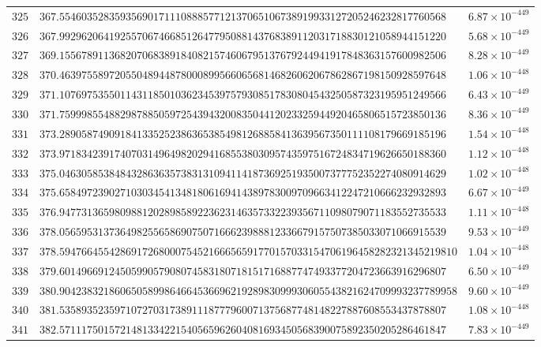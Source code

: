 \documentclass[12pt,reqno]{amsart}
\theoremstyle{remark}
\begin{document}
\begin{longtable}{clc}
$325$ & $367.5546035283593569017111088857712137065106738919933127205246232817760568$ & $6.87\times 10^{-449}$ \\
$326$ & $367.9929620641925570674668512647795088143768389112031718830121058944151220$ & $5.68\times 10^{-449}$ \\
$327$ & $369.1556789113682070683891840821574606795137679244941917848363157600982506$ & $8.28\times 10^{-449}$ \\
$328$ & $370.4639755897205504894487800089956606568146826062067862867198150928597648$ & $1.06\times 10^{-448}$ \\
$329$ & $371.1076975355011431185010362345397579308517830804543250587323195951249566$ & $6.43\times 10^{-449}$ \\
$330$ & $371.7599985548829878850597254394320083504412023325944920465806515723850136$ & $8.36\times 10^{-449}$ \\
$331$ & $373.2890587490918413352523863653854981268858413639567350111108179669185196$ & $1.54\times 10^{-448}$ \\
$332$ & $373.9718342391740703149649820294168553803095743597516724834719626650188360$ & $1.12\times 10^{-448}$ \\
$333$ & $375.0463058538484328636357383131094114187369251935007377752352274080914629$ & $1.02\times 10^{-448}$ \\
$334$ & $375.6584972390271030345413481806169414389783009709663412247210666232932893$ & $6.67\times 10^{-449}$ \\
$335$ & $376.9477313659809881202898589223623146357332239356711098079071183552735533$ & $1.11\times 10^{-448}$ \\
$336$ & $378.0565953137364982556586907507166623988812336679157507385033071066915539$ & $9.53\times 10^{-449}$ \\
$337$ & $378.594766455428691726800075452166656591770157033154706196458282321345219810$ & $1.04\times 10^{-448}$ \\
$338$ & $379.6014966912450599057908074583180718151716887747493377204723663916296807$ & $6.50\times 10^{-449}$ \\
$339$ & $380.904238321860650589986466453669621928983099930605543821624709993237789958$ & $9.60\times 10^{-449}$ \\
$340$ & $381.5358935235971072703173891118777960071375687748148227887608553437878807$ & $1.08\times 10^{-448}$ \\
$341$ & $382.5711175015721481334221540565962604081693450568390075892350205286461847$ & $7.83\times 10^{-449}$ \\

\end{longtable}
\end{document}
